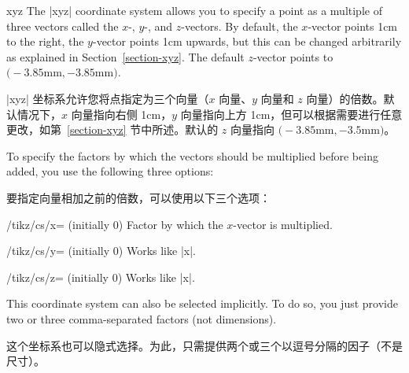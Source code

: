 \begin{coordinatesystem}{xyz}
    The |xyz| coordinate system allows you to specify a point as a multiple of
    three vectors called the $x$-, $y$-, and $z$-vectors. By default, the
    $x$-vector points 1cm to the right, the $y$-vector points 1cm upwards, but
    this can be changed arbitrarily as explained in Section~\ref{section-xyz}.
    The default $z$-vector points to
    $\bigl(-3.85\textrm{mm},-3.85\textrm{mm}\bigr)$.

    |xyz| 坐标系允许您将点指定为三个向量（$x$ 向量、$y$ 向量和 $z$ 向量）的倍数。默认情况下，$x$ 向量指向右侧 1cm，$y$ 向量指向上方 1cm，但可以根据需要进行任意更改，如第~\ref{section-xyz} 节中所述。默认的 $z$ 向量指向 $\bigl(-3.85\textrm{mm},-3.5\textrm{mm}\bigr)$。


    To specify the factors by which the vectors should be multiplied before
    being added, you use the following three options:
    
    要指定向量相加之前的倍数，可以使用以下三个选项：%
    \begin{key}{/tikz/cs/x= (initially 0)}
        Factor by which the $x$-vector is multiplied.
    \end{key}
    \begin{key}{/tikz/cs/y= (initially 0)}
        Works like |x|.
    \end{key}
    \begin{key}{/tikz/cs/z= (initially 0)}
        Works like |x|.
    \end{key}

\begin{codeexample}[]
\end{codeexample}

    This coordinate system can also be selected implicitly. To do so, you just
    provide two or three comma-separated factors (not dimensions).
    
    
    这个坐标系也可以隐式选择。为此，只需提供两个或三个以逗号分隔的因子（不是尺寸）。
%
\begin{codeexample}[]
\end{codeexample}
\end{coordinatesystem}

